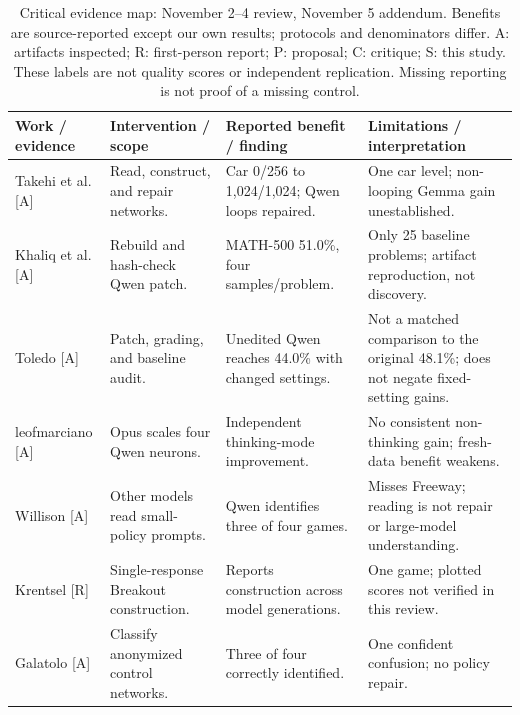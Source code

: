 \begin{table}[!t]
\centering
\caption{Critical evidence map: November 2--4 review, November 5 addendum. Benefits are source-reported except our own results; protocols and denominators differ. A: artifacts inspected; R: first-person report; P: proposal; C: critique; S: this study. These labels are not quality scores or independent replication. Missing reporting is not proof of a missing control.}
\label{tab:literature}
\fontsize{8.3}{9.5}\selectfont
\setlength{\tabcolsep}{3pt}
\renewcommand{\arraystretch}{1.02}
\begin{tabularx}{\textwidth}{@{}>{\RaggedRight\arraybackslash}p{}>{\RaggedRight\arraybackslash}p{}>{\RaggedRight\arraybackslash}p{}>{\RaggedRight\arraybackslash}X@{}}
\toprule
\textbf{Work / evidence} & \textbf{Intervention / scope} & \textbf{Reported benefit / finding} & \textbf{Limitations / interpretation} \\
\midrule
Takehi et al. [A] \citep{takehi2026sparks} & Read, construct, and repair networks. & Car 0/256 to 1,024/1,024; Qwen loops repaired. & One car level; non-looping Gemma gain unestablished. \\
Khaliq et al. [A] \citep{khaliq2026} & Rebuild and hash-check Qwen patch. & MATH-500 51.0\%, four samples/problem. & Only 25 baseline problems; artifact reproduction, not discovery. \\
Toledo [A] \citep{toledo2026audit} & Patch, grading, and baseline audit. & Unedited Qwen reaches 44.0\% with changed settings. & Not a matched comparison to the original 48.1\%; does not negate fixed-setting gains. \\
leofmarciano [A] \citep{marciano2026} & Opus scales four Qwen neurons. & Independent thinking-mode improvement. & No consistent non-thinking gain; fresh-data benefit weakens. \\
Willison [A] \citep{willison2026} & Other models read small-policy prompts. & Qwen identifies three of four games. & Misses Freeway; reading is not repair or large-model understanding. \\
Krentsel [R] \citep{krentsel2026} & Single-response Breakout construction. & Reports construction across model generations. & One game; plotted scores not verified in this review. \\
Galatolo [A] \citep{galatolo2026} & Classify anonymized control networks. & Three of four correctly identified. & One confident confusion; no policy repair. \\

\end{tabularx}
\end{table}
